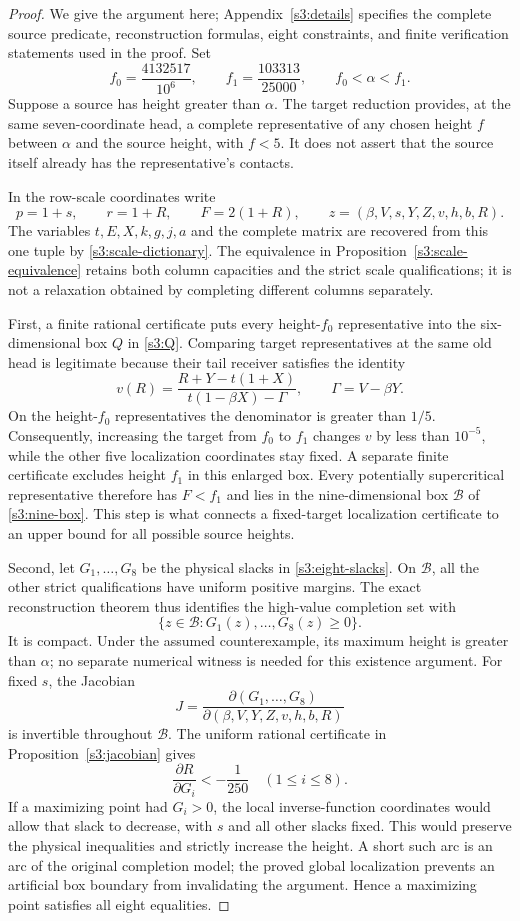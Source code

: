 \documentclass[11pt,reqno]{amsart}
\theoremstyle{definition}
\theoremstyle{remark}
\begin{document}
\begin{proof}
We give the argument here; Appendix~\ref{s3:details} specifies the
complete source predicate, reconstruction formulas, eight constraints,
and finite verification statements used in the proof.
Set
\[
 f_0=\frac{4132517}{10^6},\qquad
 f_1=\frac{103313}{25000},\qquad f_0<\alpha<f_1.
\]
Suppose a source has height greater than \(\alpha\). The target
reduction provides, at the same seven-coordinate head, a complete
representative of any chosen height \(f\) between \(\alpha\) and the
source height, with \(f<5\). It does not assert that the source itself
already has the representative's contacts.

In the row-scale coordinates write
\[
 p=1+s,\qquad r=1+R,\qquad F=2(1+R),
 \qquad z=(\beta,V,s,Y,Z,v,h,b,R).
\]
The variables \(t,E,X,k,g,j,a\) and the complete matrix are recovered
from this one tuple by \eqref{s3:scale-dictionary}.
The equivalence in Proposition~\ref{s3:scale-equivalence} retains
both column capacities and the strict scale qualifications; it is
not a relaxation obtained by completing different columns separately.

First, a finite rational certificate puts every height-\(f_0\)
representative into the six-dimensional box \(Q\) in
\eqref{s3:Q}. Comparing target representatives at the same old head
is legitimate because their tail receiver satisfies the identity
\[
 v(R)=\frac{R+Y-t(1+X)}{t(1-\beta X)-\Gamma},
 \qquad \Gamma=V-\beta Y.
\]
On the height-\(f_0\) representatives the denominator is greater
than \(1/5\). Consequently, increasing the target from \(f_0\) to
\(f_1\) changes \(v\) by less than \(10^{-5}\), while the other
five localization coordinates stay fixed. A separate finite certificate
excludes height \(f_1\) in this enlarged box. Every potentially
supercritical representative therefore has \(F<f_1\) and lies in the
nine-dimensional box \(\mathcal B\) of \eqref{s3:nine-box}.
This step is what connects a fixed-target localization certificate to
an upper bound for all possible source heights.

Second, let \(G_1,\ldots,G_8\) be the physical slacks in
\eqref{s3:eight-slacks}. On \(\mathcal B\), all the other strict
qualifications have uniform positive margins. The exact
reconstruction theorem thus identifies the high-value completion set
with
\[
 \{z\in\mathcal B:G_1(z),\ldots,G_8(z)\ge0\}.
\]
It is compact. Under the assumed counterexample, its maximum height
is greater than \(\alpha\); no separate numerical witness is needed
for this existence argument.
For fixed \(s\), the Jacobian
\[
 J=\frac{\partial(G_1,\ldots,G_8)}
 {\partial(\beta,V,Y,Z,v,h,b,R)}
\]
is invertible throughout \(\mathcal B\). The uniform rational
certificate in Proposition~\ref{s3:jacobian} gives
\[
 \frac{\partial R}{\partial G_i}<-\frac1{250}
 \quad(1\le i\le8).
\]
If a maximizing point had \(G_i>0\), the local inverse-function
coordinates would allow that slack to decrease, with \(s\) and all
other slacks fixed. This would preserve the physical inequalities
and strictly increase the height. A short such arc is an arc of the
original completion model; the proved global localization prevents
an artificial box boundary from invalidating the argument.
Hence a maximizing point satisfies all eight equalities.


\end{proof}
\end{document}
